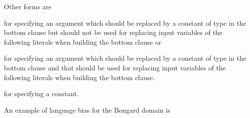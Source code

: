 \documentclass[letterpaper,10pt,english]{sphinxmanual}
\begin{document}
\sphinxAtStartPar
Other forms are

\begin{sphinxVerbatim}[commandchars=\\\{\}]
\end{sphinxVerbatim}

\sphinxAtStartPar
for specifying an argument which should be replaced by a constant of type  in the bottom clause but should not be used for replacing input variables of the following literals when building the bottom clause or

\begin{sphinxVerbatim}[commandchars=\\\{\}]
\end{sphinxVerbatim}

\sphinxAtStartPar
for specifying an argument which should be replaced by a constant of type  in the bottom clause and that should be used for replacing input variables of the following literals when building the bottom clause.

\begin{sphinxVerbatim}[commandchars=\\\{\}]
\end{sphinxVerbatim}

\sphinxAtStartPar
for specifying a constant.

\sphinxAtStartPar
An example of language bias for the Bongard domain is
\end{document}
